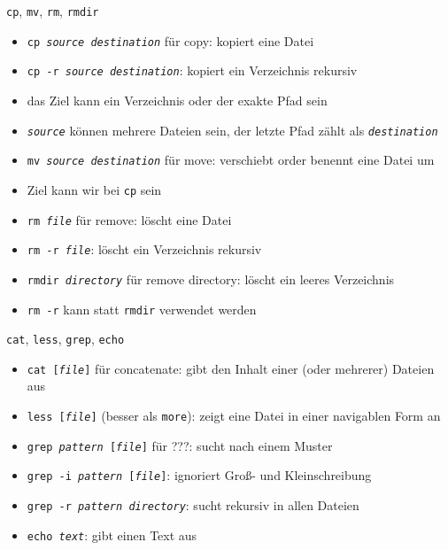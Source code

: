     \begin{frame}{\texttt{cp}, \texttt{mv}, \texttt{rm}, \texttt{rmdir}}
      \begin{itemize}
        \item \texttt{cp \textit{source} \textit{destination}} für copy: kopiert eine Datei
        \item \texttt{cp -r \textit{source} \textit{destination}}: kopiert ein Verzeichnis rekursiv
        \item das Ziel kann ein Verzeichnis oder der exakte Pfad sein
        \item \texttt{\textit{source}} können mehrere Dateien sein, der letzte Pfad zählt als \texttt{\textit{destination}}
        \item \texttt{mv \textit{source} \textit{destination}} für move: verschiebt order benennt eine Datei um
        \item Ziel kann wir bei \texttt{cp} sein
        \item \texttt{rm \textit{file}} für remove: löscht eine Datei
        \item \texttt{rm -r \textit{file}}: löscht ein Verzeichnis rekursiv
        \item \texttt{rmdir \textit{directory}} für remove directory: löscht ein leeres Verzeichnis
        \item \texttt{rm -r} kann statt \texttt{rmdir} verwendet werden
      \end{itemize}
    \end{frame}

    \begin{frame}{\texttt{cat}, \texttt{less}, \texttt{grep}, \texttt{echo}}
      \begin{itemize}
        \item \texttt{cat [\textit{file}]} für concatenate: gibt den Inhalt einer (oder mehrerer) Dateien aus
        \item \texttt{less [\textit{file}]} (besser als \texttt{more}): zeigt eine Datei in einer navigablen Form an
        \item \texttt{grep \textit{pattern} [\textit{file}]} für ???: sucht nach einem Muster
        \item \texttt{grep -i \textit{pattern} [\textit{file}]}: ignoriert Groß- und Kleinschreibung
        \item \texttt{grep -r \textit{pattern} \textit{directory}}: sucht rekursiv in allen Dateien
        \item \texttt{echo \textit{text}}: gibt einen Text aus
      \end{itemize}
    \end{frame}

